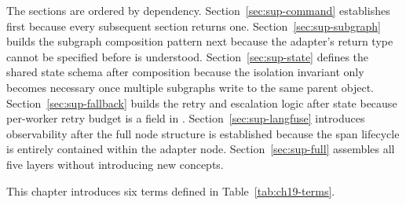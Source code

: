 The sections are ordered by dependency. Section~\ref{sec:sup-command}
establishes  first because every subsequent section returns
one. Section~\ref{sec:sup-subgraph} builds the subgraph composition
pattern next because the adapter's return type cannot be specified before
 is understood. Section~\ref{sec:sup-state} defines the
shared state schema after composition because the isolation invariant only
becomes necessary once multiple subgraphs write to the same parent object.
Section~\ref{sec:sup-fallback} builds the retry and escalation logic after
state because per-worker retry budget is a field in .
Section~\ref{sec:sup-langfuse} introduces observability after the full
node structure is established because the span lifecycle is entirely
contained within the adapter node. Section~\ref{sec:sup-full} assembles
all five layers without introducing new concepts.

This chapter introduces six terms defined in Table~\ref{tab:ch19-terms}.

